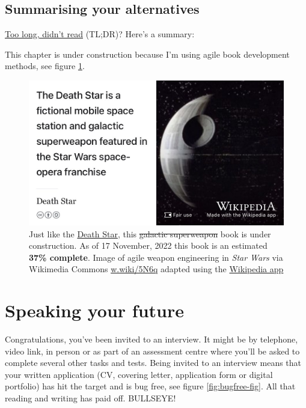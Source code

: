 \documentclass[
]{book}
\begin{document}
\hypertarget{tldr11}{%
\section{Summarising your alternatives}\label{tldr11}}

\href{https://en.wiktionary.org/wiki/too_long;_didn\%27t_read}{Too long, didn't read} (TL;DR)? Here's a summary:

This chapter is under construction because I'm using agile book development methods, see figure \ref{fig:deathstar8-fig}.

\begin{figure}

{\centering \includegraphics[width=0.99\linewidth]{images/DeathStar2} 

}

\caption{Just like the \href{https://en.wikipedia.org/wiki/Death_Star}{Death Star}, this \sout{galactic superweapon} book is under construction. As of 17 November, 2022 this book is an estimated \textbf{37\% complete}. Image of agile weapon engineering in \emph{Star Wars} via Wikimedia Commons \href{https://w.wiki/5N6q}{w.wiki/5N6q} adapted using the \href{https://apps.apple.com/gb/app/wikipedia/id324715238}{Wikipedia app}}\label{fig:deathstar8-fig}
\end{figure}

\hypertarget{speaking}{%
\chapter{Speaking your future}\label{speaking}}

Congratulations, you've been invited to an interview. It might be by telephone, video link, in person or as part of an assessment centre where you'll be asked to complete several other tasks and tests. Being invited to an interview means that your written application (CV, covering letter, application form or digital portfolio) has hit the target and is bug free, see figure \ref{fig:bugfree-fig}. All that reading and writing has paid off. BULLSEYE! 🎯
\end{document}
